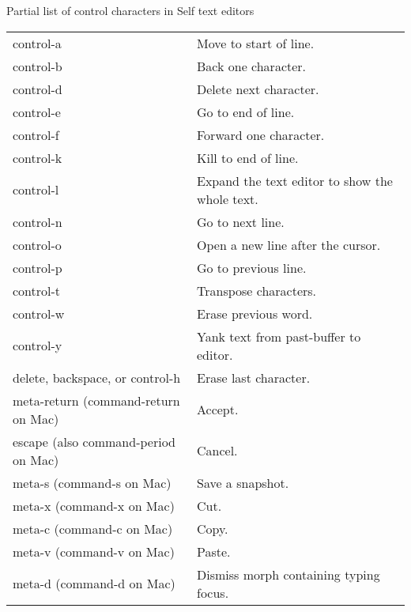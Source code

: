 \documentclass[letterpaper,10pt,english]{sphinxmanual}
\begin{document}
\begin{threeparttable}
\capstart\caption{Partial list of control characters in Self text editors}\label{\detokenize{howtoprg:id11}}
\noindent\begin{tabulary}{\linewidth}{|L|L|}
\hline
{}\relax &\relax \\
\hline
control-a
&
Move to start of line.
\\
\hline
control-b
&
Back one character.
\\
\hline
control-d
&
Delete next character.
\\
\hline
control-e
&
Go to end of line.
\\
\hline
control-f
&
Forward one character.
\\
\hline
control-k
&
Kill to end of line.
\\
\hline
control-l
&
Expand the text editor to show the whole text.
\\
\hline
control-n
&
Go to next line.
\\
\hline
control-o
&
Open a new line after the cursor.
\\
\hline
control-p
&
Go to previous line.
\\
\hline
control-t
&
Transpose characters.
\\
\hline
control-w
&
Erase previous word.
\\
\hline
control-y
&
Yank text from past-buffer to editor.
\\
\hline
delete, backspace, or control-h
&
Erase last character.
\\
\hline
meta-return (command-return on Mac)
&
Accept.
\\
\hline
escape (also command-period on Mac)
&
Cancel.
\\
\hline
meta-s (command-s on Mac)
&
Save a snapshot.
\\
\hline
meta-x (command-x on Mac)
&
Cut.
\\
\hline
meta-c (command-c on Mac)
&
Copy.
\\
\hline
meta-v (command-v on Mac)
&
Paste.
\\
\hline
meta-d (command-d on Mac)
&
Dismiss morph containing typing focus.
\\
\hline\end{tabulary}

\end{threeparttable}
\end{document}
